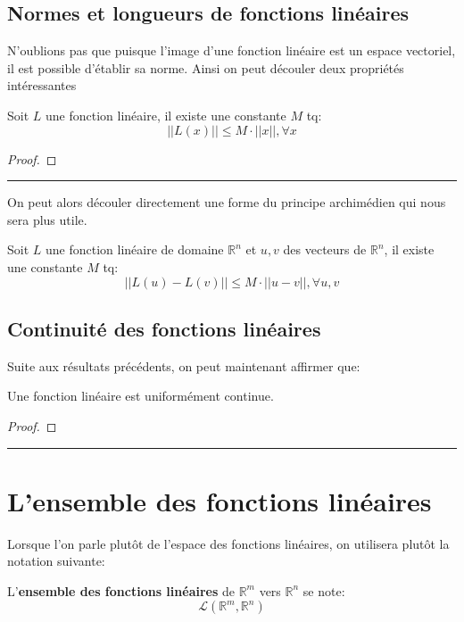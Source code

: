 \documentclass[12pt]{report}
\let\Bbb\mathbb
\theoremstyle{definition}
\newenvironment{preuve}{\renewcommand{\proofname}{Preuve}\begin{proof}}{\end{proof}\noindent\textcolor[RGB]{220,220,220}{\rule{\textwidth}{1pt}}}
\begin{document}
    \subsection{Normes et longueurs de fonctions linéaires}
    N'oublions pas que puisque l'image d'une fonction linéaire est un 
    espace vectoriel, il est possible d'établir sa norme. Ainsi on peut découler
    deux propriétés intéressantes
    \begin{prop}
        \label{thm:principe_archimedien}
        Soit $L$ une fonction linéaire, il existe une constante $M$ tq:
        $$ ||L(x)|| \leq M \cdot ||x||, \forall x $$
    \end{prop}
    \begin{preuve}
    \end{preuve}
    On peut alors découler directement une forme du principe archimédien qui 
    nous sera plus utile.
    \begin{prop}
        \label{thm:principe_archimedien_2}
        Soit $L$ une fonction linéaire de domaine $\Bbb R^n$ et $u, v$ des vecteurs de $\Bbb R^n$, il existe une constante $M$ tq:
        $$ ||L(u) - L(v)|| \leq M \cdot ||u - v||, \forall u,v $$
    \end{prop}
    \subsection{Continuité des fonctions linéaires}
    Suite aux résultats précédents, on peut maintenant affirmer que:
    \begin{prop}
        \label{thm:continuite_uniforme_fonction_lineaire}
        Une fonction linéaire est uniformément continue.
    \end{prop}
    \begin{preuve}
    \end{preuve}
\section{L'ensemble des fonctions linéaires}
    Lorsque l'on parle plutôt de l'espace des fonctions linéaires, on utilisera plutôt
    la notation suivante:

    \begin{defi}
        \label{def:ensemble_fonctions_lineaires}
        L'\textbf{ensemble des fonctions linéaires} de $\Bbb R^m$ vers $\Bbb R^n$ se note:
        $$\mathcal{L}(\Bbb R^m, \Bbb R^n)$$
    \end{defi}
\end{document}
